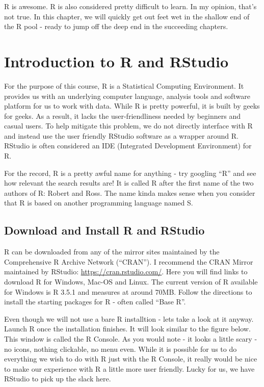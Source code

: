 \documentclass[]{krantz}
\begin{document}
R is awesome. R is also considered pretty difficult to learn. In my
opinion, that's not true. In this chapter, we will quickly get out feet
wet in the shallow end of the R pool - ready to jump off the deep end in
the succeeding chapters.

\section{Introduction to R and
RStudio}\label{introduction-to-r-and-rstudio}

For the purpose of this course, R is a Statistical Computing
Environment. It provides us with an underlying computer language,
analysis tools and software platform for us to work with data. While R
is pretty powerful, it is built by geeks for geeks. As a result, it
lacks the user-friendliness needed by beginners and casual users. To
help mitigate this problem, we do not directly interface with R and
instead use the user friendly RStudio software as a wrapper around R.
RStudio is often considered an IDE (Integrated Development Environment)
for R.

For the record, R is a pretty awful name for anything - try googling
``R'' and see how relevant the search results are! It is called R after
the first name of the two authors of R: Robert and Ross. The name kinda
makes sense when you consider that R is based on another programming
language named S.

\subsection{Download and Install R and
RStudio}\label{download-and-install-r-and-rstudio}

R can be downloaded from any of the mirror sites maintained by the
Comprehensive R Archive Network (``CRAN''). I recommend the CRAN Mirror
maintained by RStudio: \url{https://cran.rstudio.com/}. Here you will
find links to download R for Windows, Mac-OS and Linux. The current
version of R available for Windows is R 3.5.1 and measures at around
70MB. Follow the directions to install the starting packages for R -
often called ``Base R''.

Even though we will not use a bare R installtion - lets take a look at
it anyway. Launch R once the installation finishes. It will look similar
to the figure below. This window is called the R Console. As you would
note - it looks a little scary - no icons, nothing clickable, no menu
even. While it is possible for us to do everything we wish to do with R
just with the R Console, it really would be nice to make our experience
with R a little more user friendly. Lucky for us, we have RStudio to
pick up the slack here.
\end{document}
